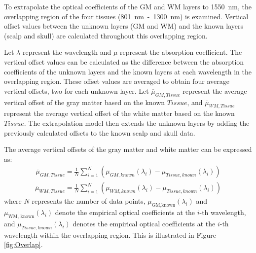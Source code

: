 \documentclass[journal,twoside,web]{ieeecolor}
\begin{document}
To extrapolate the optical coefficients of the GM and WM layers to 1550~nm, the overlapping region of the four tissues 
(801~nm~-~1300~nm) is examined. Vertical offset values between the unknown layers (GM and WM) and the known layers (scalp and skull) are calculated throughout 
this overlapping region.

Let \( \lambda \) represent the wavelength and \( \mu \) represent the absorption coefficient. The vertical offset values can be calculated as the 
difference between the absorption coefficients of the unknown layers and the known layers at each wavelength in the overlapping region. 
These offset values are averaged to obtain four average vertical offsets, two for each unknown layer. Let $\overline{\mu}_{GM, Tissue}$ represent the 
average vertical offset of the gray matter based on the known $Tissue$, and $\overline{\mu}_{WM, Tissue}$ represent the average vertical offset of the white 
matter based on the known $Tissue$. The extrapolation model then extends the unknown layers by adding the previously calculated offsets to the known scalp 
and skull data.

The average vertical offsets of the gray matter and white matter can be expressed as:
\begin{equation}
    \label{eq:AvgGM}
    \begin{aligned}
    \overline{\mu}_{GM, Tissue} = \frac{1}{N} \sum_{i=1}^{N} (\mu_{GM,known}(\lambda_i) - \mu_{Tissue, known}(\lambda_i)) 
    \end{aligned}
\end{equation}
\begin{equation}
    \label{eq:AvgWM}
    \begin{aligned}
    \overline{\mu}_{WM, Tissue} = \frac{1}{N} \sum_{i=1}^{N} (\mu_{WM,known}(\lambda_i) - \mu_{Tissue, known}(\lambda_i))
    \end{aligned}
\end{equation}
where \( N \) represents the number of data points, \( \mu_{\text{GM,known}}(\lambda_i) \) and \( \mu_{\text{WM, known}}(\lambda_i) \) 
denote the empirical optical coefficients at the \( i \)-th wavelength, and \( \mu_{Tissue,known}(\lambda_i) \) denotes 
the empirical optical coefficients at the \( i \)-th wavelength within the overlapping region. This is illustrated in Figure \ref{fig:Overlap}.
\end{document}
